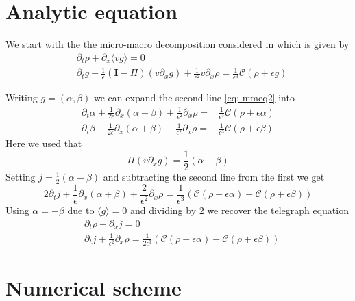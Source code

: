 \documentclass[]{article}
\title{}
\author{}
\begin{document}
\maketitle

\section{Analytic equation}

We start with the the micro-macro decomposition considered in \cite{JaLiQiXi2014} which is given by
\begin{subequations}
\begin{align}
& \partial_t \rho + \partial_x \langle v g \rangle = 0 \label{eq: mmeq1} \\
& \partial_t g + \frac{1}{\epsilon} (\mathbf{I} - \Pi) (v \partial_x g) + \frac{1}{\epsilon^2} v \partial_x \rho= \frac{1}{\epsilon^3} \mathcal{C}(\rho + \epsilon g) \label{eq: mmeq2}
\end{align}
\end{subequations}

Writing $g = (\alpha, \beta)$ we can expand the second line \eqref{eq: mmeq2} into
\begin{align*}
\partial_t \alpha + \frac{1}{2 \epsilon} \partial_x (\alpha + \beta)+ \frac{1}{\epsilon^2} \partial_x \rho = & \frac{1}{\epsilon^3} \mathcal{C}(\rho + \epsilon \alpha)\\
\partial_t \beta - \frac{1}{2\epsilon} \partial_x (\alpha + \beta)- \frac{1}{\epsilon^2} \partial_x \rho = & \frac{1}{\epsilon^3} \mathcal{C}(\rho + \epsilon \beta)
\end{align*}
Here we used that
\[
\Pi (v \partial_x g) = \frac{1}{2}(\alpha - \beta)
\]
Setting $j = \frac{1}{2}(\alpha - \beta)$ and subtracting the second line from the first we get
\[
2 \partial_t j + \frac{1}{\epsilon} \partial_x (\alpha + \beta) + \frac{2}{\epsilon^2} \partial_x \rho = \frac{1}{\epsilon^3} (\mathcal{C}(\rho + \epsilon \alpha) - \mathcal{C}(\rho + \epsilon \beta)) 
\]
Using $\alpha = -\beta$ due to $\langle g \rangle = 0$ and dividing by $2$ we recover the telegraph equation
\begin{align*}
& \partial_t \rho + \partial_x j = 0\\
& \partial_t j + \frac{1}{\epsilon^2} \partial_x \rho = \frac{1}{2\epsilon^3} (\mathcal{C}(\rho + \epsilon \alpha) - \mathcal{C}(\rho + \epsilon \beta)) 
\end{align*}

\section{Numerical scheme}
\end{document}

